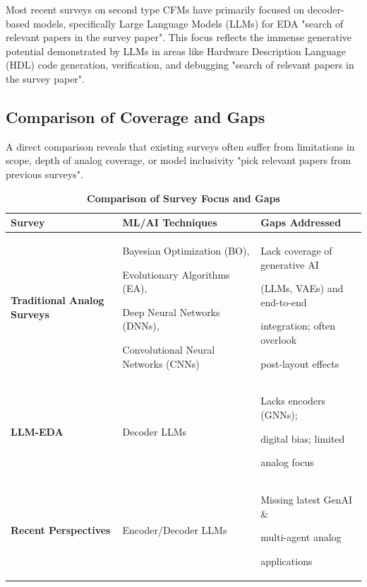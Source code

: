 \documentclass{ieeeaccess}
\begin{document}
Most recent surveys on second type CFMs have primarily focused on decoder-based
models, specifically Large Language Models (LLMs) for EDA "search of relevant
papers in the survey paper". This focus reflects the immense generative
potential demonstrated by LLMs in areas like Hardware Description Language
(HDL) code generation, verification, and debugging "search of relevant papers
in the survey paper".

\subsection{Comparison of Coverage and Gaps}

A direct comparison reveals that existing surveys often suffer from limitations
in scope, depth of analog coverage, or model inclusivity "pick relevant papers
from previous surveys".

\begin{table}[h!]
	\caption{\textbf{Comparison of Survey Focus and Gaps}}
	\label{tab:survey_comparison}
	\setlength{\tabcolsep}{3pt}
	\begin{tabular}{|p{35pt}|p{75pt}|p{105pt}|}
		\hline
		\textbf{Survey}                                                                                                                            & \textbf{ML/AI Techniques}                                                                                                 & \textbf{Gaps Addressed} \\
		\hline
		\textbf{Traditional Analog Surveys}                                                                                                        &
		Bayesian Optimization (BO), \par Evolutionary Algorithms (EA), \par Deep Neural Networks (DNNs), \par Convolutional Neural Networks (CNNs) & Lack coverage of generative AI \par (LLMs, VAEs) and end-to-end \par integration; often overlook \par post-layout effects                           \\ \hline \textbf{LLM-EDA} & Decoder LLMs & Lacks encoders
		(GNNs); \par digital bias; limited \par analog focus                                                                                                                                                                                                                                             \\ \hline \textbf{Recent Perspectives} & Encoder/Decoder LLMs &
		Missing latest GenAI \& \par multi-agent analog \par applications                                                                                                                                                                                                                                \\ \hline
	\end{tabular}
\end{table}
\end{document}
